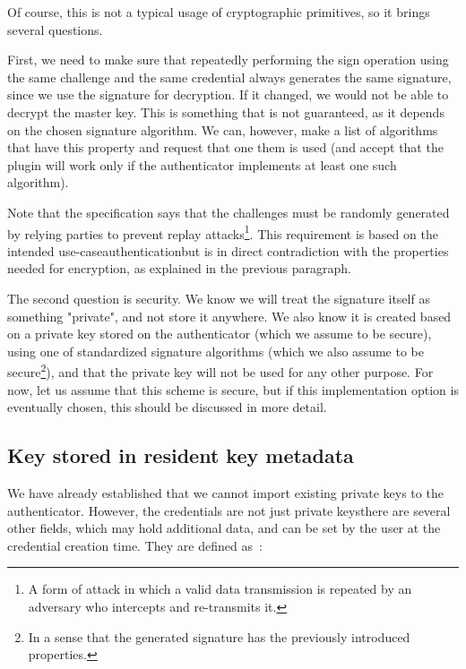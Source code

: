 Of course, this is not a typical usage of cryptographic primitives, so it brings several questions.

First, we need to make sure that repeatedly performing the sign operation using the same challenge and the same
credential always generates the same signature, since we use the signature for decryption. If it changed,
we would not be able to decrypt the master key. This is something that is not guaranteed, as it depends on
the chosen signature algorithm. We can, however, make a list of algorithms that have this property and
request that one them is used (and accept that the plugin will work only if the authenticator implements at least one such algorithm).

Note that the  specification says that the challenges must be randomly generated by relying parties
to prevent replay attacks\footnote{A form of attack in which a valid data transmission is repeated by an adversary who intercepts and re-transmits it.}.
This requirement is based on the intended use-case\textemdash authentication\textemdash but is in direct contradiction with the
properties needed for encryption, as explained in the previous paragraph.

The second question is security. We know we will treat the signature itself as something "private",
and not store it anywhere. We also know it is created based on a private key stored on the authenticator
(which we assume to be secure), using one of standardized signature algorithms (which we also assume to be secure\footnote{
	In a sense that the generated signature has the previously introduced properties.
}), and that the private key will not be used for any other purpose. For now, let us assume that this scheme is secure,
but if this implementation option is eventually chosen, this should be discussed in more detail.

\subsection{Key stored in resident key metadata}\label{subsec:key-stored-as-resident-key-metadata}

We have already established that we cannot import existing private keys to the authenticator.
However, the credentials are not just private keys\textemdash there are several other fields, which may hold
additional data, and can be set by the user at the credential creation time. They are defined as~\cite{fido:ctap}:

